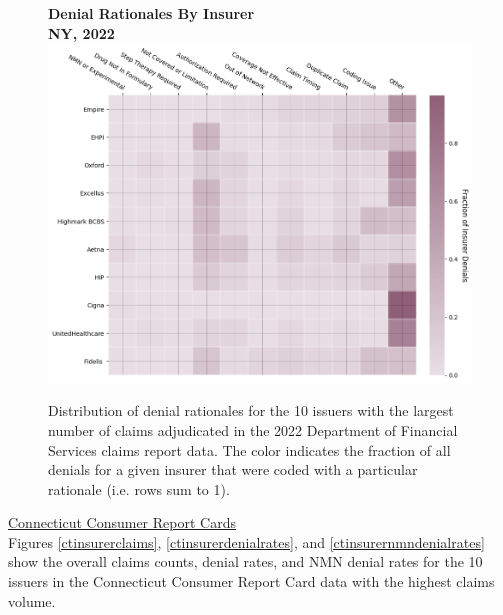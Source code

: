 \documentclass[12pt, a4paper,twoside,parskip=full]{report}
\theoremstyle{plain} %
\theoremstyle{definition} %
\theoremstyle{remark} %
\numberwithin{equation}{chapter}
\begin{document}
		\begin{figure}[h!]
			\centering
			\textbf{Denial Rationales By Insurer}\\
			\textbf{NY, 2022}\\
			\includegraphics[width=\columnwidth]{images/ny_claim_reports/insurer_vs_denial_cat.png}
			\caption{Distribution of denial rationales for the 10 issuers with the largest number of claims adjudicated in the 2022 Department of Financial Services claims report data. The color indicates the fraction of all denials for a given insurer that were coded with a particular rationale (i.e. rows sum to 1).}
			\label{nydenialrationalesbyinsurer}
		\end{figure}
		
		\clearpage
		


		
		\underline{Connecticut Consumer Report Cards}\\
		
		
		Figures \ref{ctinsurerclaims}, \ref{ctinsurerdenialrates}, and \ref{ctinsurernmndenialrates} show the overall claims counts, denial rates, and NMN denial rates for the 10 issuers in the Connecticut Consumer Report Card data with the highest claims volume.
\end{document}
